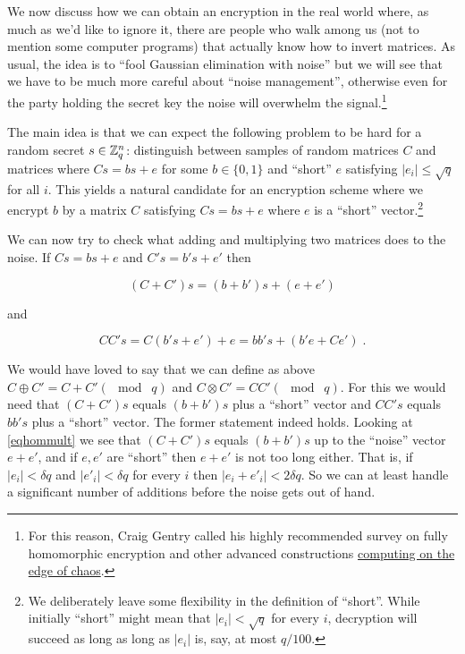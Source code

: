 We now discuss how we can obtain an encryption in the real world where,
as much as we'd like to ignore it, there are people who walk among us
(not to mention some computer programs) that actually know how to invert
matrices. As usual, the idea is to ``fool Gaussian elimination with
noise'' but we will see that we have to be much more careful about
``noise management'', otherwise even for the party holding the secret
key the noise will overwhelm the signal.\footnote{For this reason, Craig
  Gentry called his highly recommended survey on fully homomorphic
  encryption and other advanced constructions
  \href{https://eprint.iacr.org/2014/610}{computing on the edge of
  chaos}.}

The main idea is that we can expect the following problem to be hard for
a random secret \(s\in{\mathbb{Z}}_q^n\): distinguish between samples of random
matrices \(C\) and matrices where \(Cs = bs + e\) for some
\(b\in\{0,1\}\) and ``short'' \(e\) satisfying \(|e_i| \leq \sqrt{q}\)
for all \(i\). This yields a natural candidate for an encryption scheme
where we encrypt \(b\) by a matrix \(C\) satisfying \(Cs = bs + e\)
where \(e\) is a ``short'' vector.\footnote{We deliberately leave some
  flexibility in the definition of ``short''. While initially ``short''
  might mean that \(|e_i|<\sqrt{q}\) for every \(i\), decryption will
  succeed as long as long as \(|e_i|\) is, say, at most \(q/100\).}

We can now try to check what adding and multiplying two matrices does to
the noise. If \(Cs = bs+e\) and \(C's=b's+e'\) then

\[(C+C')s = (b+b')s+(e+e') \label{eqhomadd}\]

and

\[\ensuremath{\mathit{CC}}'s = C(b's+e')+e =bb's+ (b'e+Ce')\;. \label{eqhommult} \]


We would have loved to say that we can define as above
\(C\oplus C' = C+C' (\mod\; q)\) and
\(C\otimes C' = \ensuremath{\mathit{CC}}' (\mod \; q)\). For this we
would need that \((C+C')s\) equals \((b+b')s\) plus a ``short'' vector
and \(\ensuremath{\mathit{CC}}'s\) equals \(bb's\) plus a ``short''
vector. The former statement indeed holds. Looking at \eqref{eqhommult}
we see that \((C+C')s\) equals \((b+b')s\) up to the ``noise'' vector
\(e+e'\), and if \(e,e'\) are ``short'' then \(e+e'\) is not too long
either. That is, if \(|e_i|<\delta q\) and \(|e'_i|<\delta q\) for every
\(i\) then \(|e_i+e'_i|<2\delta q\). So we can at least handle a
significant number of additions before the noise gets out of hand.

